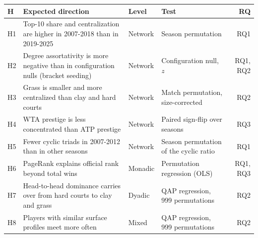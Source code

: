 \begin{tabular}{@{}l>{\raggedright\arraybackslash}p{4.7cm}llr@{}}
\toprule
H & Expected direction & Level & Test & RQ \\
\midrule
H1 & Top-10 share and centralization are higher in 2007-2018 than in 2019-2025 & Network & Season permutation & RQ1 \\
H2 & Degree assortativity is more negative than in configuration nulls (bracket seeding) & Network & Configuration null, $z$ & RQ1, RQ2 \\
H3 & Grass is smaller and more centralized than clay and hard courts & Network & Match permutation, size-corrected & RQ2 \\
H4 & WTA prestige is less concentrated than ATP prestige & Network & Paired sign-flip over seasons & RQ3 \\
H5 & Fewer cyclic triads in 2007-2012 than in other seasons & Network & Season permutation of the cyclic ratio & RQ1 \\
H6 & PageRank explains official rank beyond total wins & Monadic & Permutation regression (OLS) & RQ1, RQ3 \\
H7 & Head-to-head dominance carries over from hard courts to clay and grass & Dyadic & QAP regression, 999 permutations & RQ2 \\
H8 & Players with similar surface profiles meet more often & Mixed & QAP regression, 999 permutations & RQ2 \\
\bottomrule
\end{tabular}
